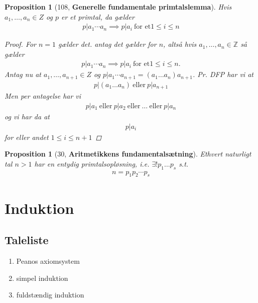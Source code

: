 \documentclass[10pt,twoside,openany,final]{memoir}
\theoremstyle{break}
\newtheorem{proposition}[section]{Proposition}
\theoremstyle{Break}
\newcommand{\Z}{\mathbb{Z}}
\begin{document}
\begin{proposition}[108, \textbf{Generelle fundamentale primtalslemma}]
Hvis $a_{1},\dots,a_{n} \in Z$ og $p$ er et primtal, da gælder
\begin{align*}
p|a_{1}\cdots a_{n} \implies p|a_{i} \ \text{for et} 1 \leq i \leq n
\end{align*}
\begin{proof}
For $n = 1$ gælder det. antag det gælder for $n$, altså hvis $a_{1},\dots,a_{n} \in \Z$ så gælder
\begin{align*}
p|a_{1}\cdots a_{n} \implies p|a_{i} \ \text{for et} 1 \leq i \leq n.
\end{align*}
Antag nu at $a_{1},\dots,a_{n+1} \in Z$ og $p|a_{1}\cdots a_{n+1}=(a_{1}\dots a_{n})a_{n+1}$. Pr. DFP har vi at 
\begin{align*}
p|(a_{1}\dots a_{n}) \ \text{eller} \ p|a_{n+1}
\end{align*}
Men per antagelse har vi 
\begin{align*}
p|a_{1} \ \text{eller}\ p|a_{2} \ \text{eller} \ \dots \ \text{eller}\ p|a_{n}
\end{align*}
og vi har da at 
\begin{align*}
p|a_{i}
\end{align*}
for eller andet $1\leq i \leq n+1$
\end{proof}
\end{proposition}
\begin{proposition}[30, \textbf{Aritmetikkens fundamentalsætning}]
Ethvert naturligt tal $n >1$ har en entydig primtalsopløsning, i.e. $\exists! p_{1} \dots p_{s}$ s.t.
\begin{align*}
n=p_{1}p_{2}\cdots p_{s}
\end{align*}
\end{proposition}
\chapter{Induktion}
\section*{Taleliste}
\begin{enumerate}
\item Peanos axiomsystem
\item simpel induktion
\item fuldstændig induktion
\end{enumerate}
\end{document}
